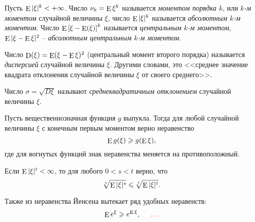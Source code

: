 \begin{to_def}
    Пусть $\mathop{\mathrm{E}}\nolimits |\xi|^k < + \infty$. Число $\nu_k = \mathop{\mathrm{E}}\nolimits \xi^k$ называется \textit{моментом порядка $k$}, или \textit{$k$-м моментом}  случайной величины $\xi$, число $\mathop{\mathrm{E}}\nolimits |\xi|^k$ называется \textit{абсолютным $k$-м моментом}. Число
    $
        \mathop{\mathrm{E}}\nolimits \left[
            \xi - \mathop{\mathrm{E}}\nolimits (\xi)
        \right]^k
    $
    называется \textit{центральным $k$-м моментом}, $\mathop{\mathrm{E}}\nolimits |\xi - \mathop{\mathrm{E}}\nolimits \xi|^2$ -- \textit{абсолютным центральным $k$-м моментом}.
\end{to_def}

\begin{to_def}
    Число $\mathop{\mathrm{D}}\nolimits (\xi) = \mathop{\mathrm{E}}\nolimits (\xi - \mathop{\mathrm{E}}\nolimits \xi)^2$ (центральный момент второго порядка)  называется \textit{дисперсией} случайной величины $\xi$.  Другими словами, это <<среднее значение квадрата отклонения случайной величины $\xi$ от своего среднего>>.
\end{to_def}

\begin{to_def}
    Число $\sigma = \sqrt{ D \xi}$ называют \textit{среднеквадратичным отклонением} случайной величины $\xi$.
\end{to_def}

\begin{to_thr}
    Пусть вещественнозначная функция $g$ выпукла. Тогда для любой случайной величины $\xi$ с конечным первым моментом верно неравенство
    \begin{equation*}
        \mathop{\mathrm{E}}\nolimits g(\xi) \geqslant g (\mathop{\mathrm{E}}\nolimits \xi),
    \end{equation*}
    где для вогнутых функций знак неравенства меняется на противоположный. 
\end{to_thr}

\begin{to_lem}
    Если $\mathop{\mathrm{E}}\nolimits |\xi|^t < \infty$, то для любого $0 < s < t$ верно, что
    \begin{equation*}
        \sqrt[s]{\mathop{\mathrm{E}}\nolimits |\xi|^s} \leqslant \sqrt[t]{\mathop{\mathrm{E}}\nolimits |\xi|^t}.
    \end{equation*}
\end{to_lem}

\noindent
Также из неравенства Йенсена вытекает ряд удобных неравенств:
\begin{equation*}
    \mathop{\mathrm{E}}\nolimits e^{\xi} \geqslant e^{\mathop{\mathrm{E}}\nolimits \xi},
    \hspace{5 mm}
    \textcolor{red}{\ldots}
\end{equation*}